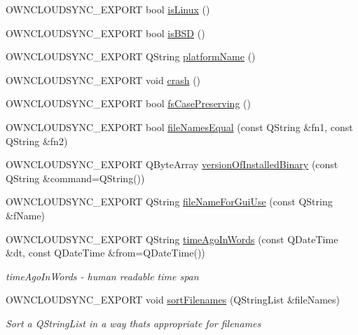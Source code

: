 \begin{DoxyCompactItemize}
\item 
O\+W\+N\+C\+L\+O\+U\+D\+S\+Y\+N\+C\+\_\+\+E\+X\+P\+O\+RT bool \hyperlink{namespace_o_c_c_1_1_utility_afc1774f88e908263fa577879b7cb1587}{is\+Linux} ()
\item 
O\+W\+N\+C\+L\+O\+U\+D\+S\+Y\+N\+C\+\_\+\+E\+X\+P\+O\+RT bool \hyperlink{namespace_o_c_c_1_1_utility_a663aa43ebb0a38ddc1c814ce7644d0d1}{is\+B\+SD} ()
\item 
O\+W\+N\+C\+L\+O\+U\+D\+S\+Y\+N\+C\+\_\+\+E\+X\+P\+O\+RT Q\+String \hyperlink{namespace_o_c_c_1_1_utility_a2cc733459fb0ffa43ceb1ef459bb1e9a}{platform\+Name} ()
\item 
O\+W\+N\+C\+L\+O\+U\+D\+S\+Y\+N\+C\+\_\+\+E\+X\+P\+O\+RT void \hyperlink{namespace_o_c_c_1_1_utility_aecc25c7e7b37a8be13da47b4f550a9e0}{crash} ()
\item 
O\+W\+N\+C\+L\+O\+U\+D\+S\+Y\+N\+C\+\_\+\+E\+X\+P\+O\+RT bool \hyperlink{namespace_o_c_c_1_1_utility_aa60741b25d0d624446071c1e201935ad}{fs\+Case\+Preserving} ()
\item 
O\+W\+N\+C\+L\+O\+U\+D\+S\+Y\+N\+C\+\_\+\+E\+X\+P\+O\+RT bool \hyperlink{namespace_o_c_c_1_1_utility_ac400f2a768d0f1a725507b63ffcce87f}{file\+Names\+Equal} (const Q\+String \&fn1, const Q\+String \&fn2)
\item 
O\+W\+N\+C\+L\+O\+U\+D\+S\+Y\+N\+C\+\_\+\+E\+X\+P\+O\+RT Q\+Byte\+Array \hyperlink{namespace_o_c_c_1_1_utility_ad31c8a3553f6f1591bb3856ea80edf11}{version\+Of\+Installed\+Binary} (const Q\+String \&command=Q\+String())
\item 
O\+W\+N\+C\+L\+O\+U\+D\+S\+Y\+N\+C\+\_\+\+E\+X\+P\+O\+RT Q\+String \hyperlink{namespace_o_c_c_1_1_utility_ab26315e68b8661afbe7c12de107cc7be}{file\+Name\+For\+Gui\+Use} (const Q\+String \&f\+Name)
\item 
O\+W\+N\+C\+L\+O\+U\+D\+S\+Y\+N\+C\+\_\+\+E\+X\+P\+O\+RT Q\+String \hyperlink{namespace_o_c_c_1_1_utility_a10bd34d4993a7d659c3cafdc9144cbdd}{time\+Ago\+In\+Words} (const Q\+Date\+Time \&dt, const Q\+Date\+Time \&from=Q\+Date\+Time())
\begin{DoxyCompactList}\small\item\em time\+Ago\+In\+Words -\/ human readable time span \end{DoxyCompactList}\item 
O\+W\+N\+C\+L\+O\+U\+D\+S\+Y\+N\+C\+\_\+\+E\+X\+P\+O\+RT void \hyperlink{namespace_o_c_c_1_1_utility_a4c3a05eded7862ce624511132325d0b3}{sort\+Filenames} (Q\+String\+List \&file\+Names)
\begin{DoxyCompactList}\small\item\em Sort a Q\+String\+List in a way that\textquotesingle{}s appropriate for filenames \end{DoxyCompactList}\item 

\end{DoxyCompactItemize}
